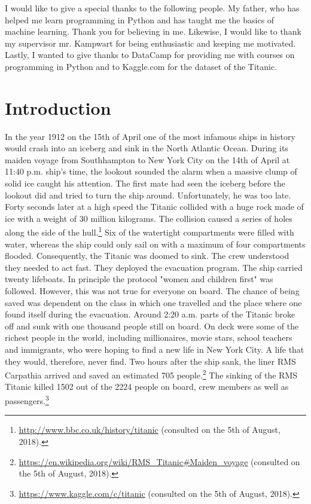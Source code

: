 \documentclass[11pt]{article}
\begin{document}
I would like to give a special thanks to the following people. My father, who has helped me learn programming in Python and has taught me the basics of machine learning. Thank you for believing in me. Likewise, I would like to thank my supervisor mr. Kampwart for being enthusiastic and keeping me motivated. Lastly, I wanted to give thanks to DataCamp for providing me with courses on programming in Python and to Kaggle.com for the dataset of the Titanic. 

\newpage

\setcounter{tocdepth}{2}
\tableofcontents

\newpage


\section{Introduction}
\label{sec:orga1712bc}

In the year 1912 on the 15th of April one of the most infamous ships in history would crash into an iceberg and sink in the North Atlantic Ocean. During its maiden voyage from Southhampton to New York City on the 14th of April at 11:40 p.m. ship's time, the lookout sounded the alarm  when a massive clump of solid ice caught his attention. The first mate had seen the iceberg before the lookout did and tried to turn the ship around. Unfortunately, he was too late. Forty seconds later at a high speed the Titanic collided with a huge rock made of ice with a weight of 30 million kilograms. The collision caused a series of holes along the side of the hull.\footnote{\url{http://www.bbc.co.uk/history/titanic} (consulted on the 5th of August, 2018).} Six of the watertight compartments were filled with water, whereas the ship could only sail on with a maximum of four compartments flooded. Consequently, the Titanic was doomed to sink. The crew understood they needed to act fast. They deployed the evacuation program. The ship carried twenty lifeboats. In principle the protocol "women and children first" was followed. However, this was not true for everyone on board. The chance of being saved was  dependent on the class in which one travelled and the place where one found itself during the evacuation. Around 2:20 a.m. parts of the Titanic broke off and sunk with one thousand people still on board. On deck were some of the richest people in the world, including millionaires, movie stars, school teachers and immigrants, who were hoping to find a new life in New York City. A life that they would, therefore, never find. Two hours after the ship sank, the liner RMS Carpathia arrived and saved an estimated 705 people.\footnote{\url{https://en.wikipedia.org/wiki/RMS\_Titanic\#Maiden\_voyage} (consulted on the 5th of August, 2018).} The sinking of the RMS Titanic killed 1502 out of the 2224 people on board, crew members as well as passengers.\footnote{\url{https://www.kaggle.com/c/titanic} (consulted on the 5th of August, 2018).}
\end{document}
